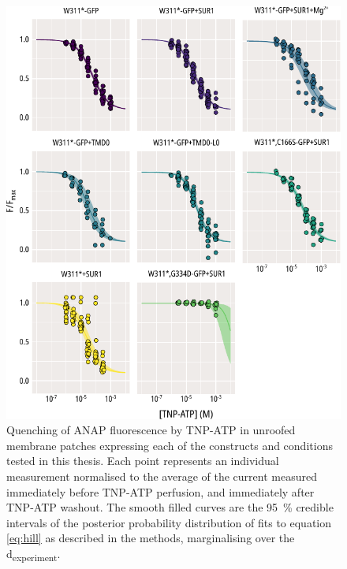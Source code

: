 \begin{figure}[h]
	\centering
	\includegraphics[width=\textwidth]{all_unroofed_fits_1.pdf}
	\caption[Unroofed membrane quenching population hill fits]{
	Quenching of ANAP fluorescence by TNP-ATP in unroofed membrane patches expressing each of the constructs and conditions tested in this thesis.
	Each point represents an individual measurement normalised to the average of the current measured immediately before TNP-ATP perfusion, and immediately after TNP-ATP washout.
	The smooth filled curves are the \SI{95}{\percent} credible intervals of the posterior probability distribution of fits to equation \ref{eq:hill} as described in the methods, marginalising over the \textgreek{d}\textsubscript{experiment}.
	}
	\label{apxfig:unroofed_1}
\end{figure}

